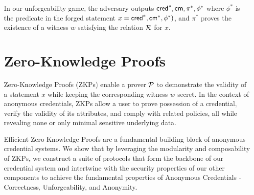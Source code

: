 
In our unforgeability game, the adversary outputs $\mathsf{cred}^*, \mathsf{cm}, \pi^*, \phi^*$ where $\phi^*$ is the predicate in the forged statement $x = \mathsf{cred}^*, \mathsf{cm}^*, \phi^*)$, and $\pi^*$ proves the existence of a witness $w$ satisfying the relation $\mathcal{R}$ for $x$.





% 
% 










%  
% 
% 
\newpage
\section{Zero-Knowledge Proofs}

Zero-Knowledge Proofs (ZKPs) enable a prover $\mathcal{P}$ to demonstrate the validity of a statement $x$ while keeping the corresponding witness $w$ secret. In the context of anonymous credentials, ZKPs allow a user to prove possession of a credential, verify the validity of its attributes, and comply with related policies, all while revealing none or only minimal sensitive underlying data.

Efficient Zero-Knowledge Proofs are a fundamental building block of anonymous credential systems. We show that by leveraging the modularity and composability of ZKPs, we construct a suite of protocols that form the backbone of our credential system and intertwine with the security properties of our other components to achieve the fundamental properties of Anonymous Credentials - Correctness, Unforgeability, and Anonymity.

